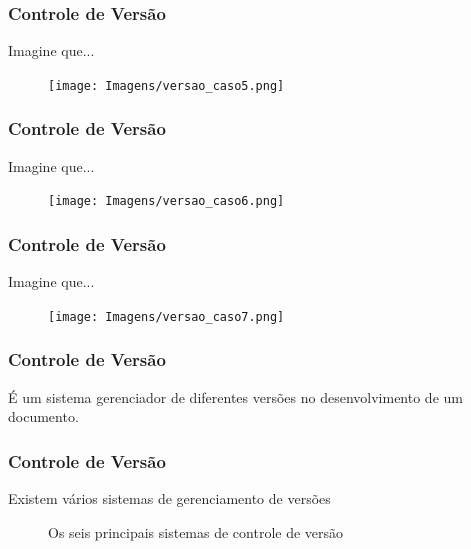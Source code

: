 \documentclass[10pt]{beamer} %
\begin{document}
\begin{frame}
\frametitle{Controle de Versão}


\begin{block}{Imagine que...}
\begin{figure}[H]
\centering
\texttt{[image: Imagens/versao\_caso5.png]}
\end{figure}

\end{block}
\end{frame}

\begin{frame}
\frametitle{Controle de Versão}


\begin{block}{Imagine que...}
\begin{figure}[H]
\centering
\texttt{[image: Imagens/versao\_caso6.png]}
\end{figure}

\end{block}
\end{frame}

\begin{frame}
\frametitle{Controle de Versão}

\begin{block}{Imagine que...}
\begin{figure}[H]
\centering
\texttt{[image: Imagens/versao\_caso7.png]}
\end{figure}

\end{block}
\end{frame}


\begin{frame}
	\frametitle{Controle de Versão}
	\begin{block}{É um sistema gerenciador de diferentes versões no desenvolvimento de um documento.}
	\end{block}
	
\end{frame}


\begin{frame}
	\frametitle{Controle de Versão}
	
	
\begin{block}{Existem vários sistemas de gerenciamento de versões}
		
\begin{figure}[h]

\center
{}
\qquad
{}
\qquad
{}
\qquad
{}
\qquad
{}
\qquad
{}
\caption{Os seis principais sistemas de controle de versão}

\end{figure}
	
\end{block}
	
\end{frame}
\end{document}
